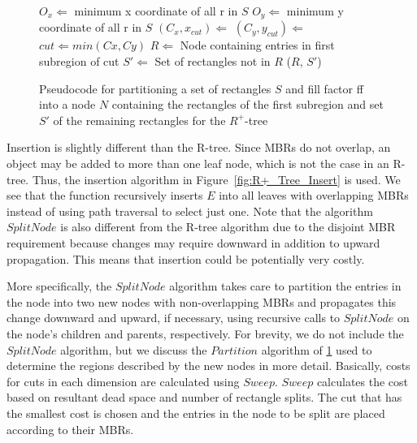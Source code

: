 \begin{figure}
\begin{algorithmic}
		\EndIf
		\State $O_{x} \Leftarrow$ minimum x coordinate of all r in $S$
		\State $O_{y} \Leftarrow$ minimum y coordinate of all r in $S$
		\State $(C_{x}, x_{cut}) \Leftarrow$ 
		\State $(C_{y}, y_{cut}) \Leftarrow$ 
		\State $cut \Leftarrow min(Cx, Cy)$
		\State $R \Leftarrow$ Node containing entries in first subregion of cut
		\State $S' \Leftarrow$ Set of rectangles not in $R$ 
		\Return ($R$, $S'$)
	\EndFunction
\end{algorithmic}
\caption{Pseudocode for partitioning a set of rectangles $S$ and fill factor ff into
	a node $N$ containing the rectangles of the first subregion and set $S'$ of
	the remaining rectangles for the $R^{+}$-tree}
\label{fig:R+_Tree_Partition}
\end{figure}

Insertion is slightly different than the R-tree. Since MBRs do not overlap, an
object may be added to more than one leaf node, which is not the case in an R-tree. 
Thus, the insertion algorithm in Figure~\ref{fig:R+_Tree_Insert} is used. We see that
the function recursively inserts $E$ into all leaves with overlapping MBRs instead of 
using path traversal to select just one. Note that the algorithm $SplitNode$ is 
also different from the R-tree algorithm due to the disjoint MBR requirement because
changes may require downward in addition to upward propagation. This means that insertion
could be potentially very costly.

More specifically, the $SplitNode$ algorithm takes care to partition the entries in 
the node into two new nodes with non-overlapping MBRs and propagates this change 
downward and upward, if necessary, using recursive calls to $SplitNode$ on the node's
children and parents, respectively. For brevity, we do not include the $SplitNode$ 
algorithm, but we discuss the $Partition$ algorithm of \ref{fig:R+_Tree_Partition} 
used to determine the regions described by the new nodes in more detail. Basically, 
costs for cuts in each dimension are calculated using $Sweep$. $Sweep$ calculates the
cost based on resultant dead space and number of rectangle splits. The cut that has 
the smallest cost is chosen and the entries in the node to be split are placed 
according to their MBRs. 

